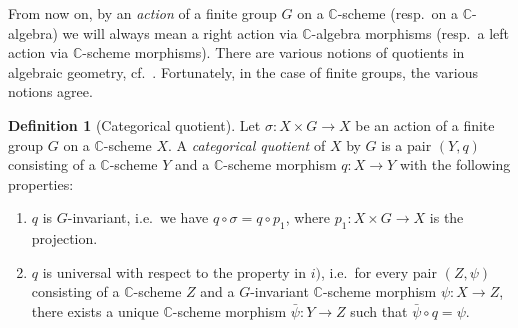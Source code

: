 \documentclass[12pt,a4paper]{amsart}
\theoremstyle{plain}
\theoremstyle{definition}
\newtheorem{defn}[thm]{Definition}
\theoremstyle{remark}
\begin{document}
From now on, by an \textit{action} of a finite group $G$ on a $\mathbb{C}$-scheme (resp.~on a $\mathbb{C}$-algebra) we will always mean a right action via $\mathbb{C}$-algebra morphisms (resp.~a left action via $\mathbb{C}$-scheme morphisms).
There are various notions of quotients in algebraic geometry, cf.~\cite[\S 0.1]{mfk94}.
Fortunately, in the case of finite groups, the various notions agree.

\begin{defn}[Categorical quotient]
  Let $\sigma \colon X \times G \to X$ be an action of a finite group $G$ on a $\mathbb{C}$-scheme $X$.
  A \textit{categorical quotient} of $X$ by $G$ is a pair $(Y,q)$ consisting of a $\mathbb{C}$-scheme $Y$ and a $\mathbb{C}$-scheme morphism $q \colon X \to Y$ with the following properties:
  \begin{enumerate}[label=\roman*)]
    \item $q$ is $G$-invariant, i.e.~we have $q \circ \sigma = q \circ p_{1}$, where $p_{1} \colon X \times G \to X$ is the projection.
    \item $q$ is universal with respect to the property in $i)$, i.e.~for every pair $(Z,\psi)$ consisting of a $\mathbb{C}$-scheme $Z$ and a $G$-invariant $\mathbb{C}$-scheme morphism $\psi \colon X \to Z$, there exists a unique $\mathbb{C}$-scheme morphism $\bar{\psi} \colon Y \to Z$ such that $\bar{\psi} \circ q = \psi$.
  \end{enumerate}
\end{defn}
\end{document}
